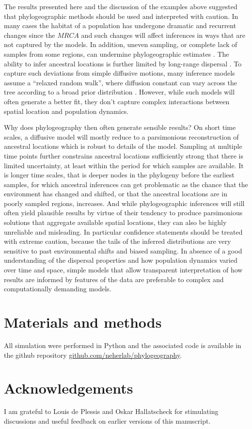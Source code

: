 \documentclass[aps,rmp, twocolumn]{revtex4}
\begin{document}
The results presented here and the discussion of the examples above suggested that phylogeographic methods should be used and interpreted with caution.
In many cases the habitat of a population has undergone dramatic and recurrent changes since the $MRCA$ and such changes will affect inferences in ways that are not captured by the models.
In addition, uneven sampling, or complete lack of samples from some regions, can undermine phylogeographic estimates \citep{kalkauskas_sampling_2021,layan_impact_2023}.
The ability to infer ancestral locations is further limited by long-range dispersal \citep{hallatschek_acceleration_2014}.
To capture such deviations from simple diffusive motions, many inference models assume a ``relaxed random walk'', where diffusion constant can vary across the tree according to a broad prior distribution \citep{dellicour_relax_2021}.
However, while such models will often generate a better fit, they don't capture complex interactions between spatial location and population dynamics.

Why does phylogeography then often generate sensible results?
On short time scales, a diffusive model will mostly reduce to a parsimonious reconstruction of ancestral locations which is robust to details of the model.
Sampling at multiple time points further constrains ancestral locations sufficiently strong that there is limited uncertainty, at least within the period for which samples are available.
It is longer time scales, that is deeper nodes in the phylogeny before the earliest samples, for which ancestral inferences can get problematic as the chance that the environment has changed and shifted, or that the ancestral locations are in poorly sampled regions, increases.
And while phylogeographic inferences will still often yield plausible results by virtue of their tendency to produce parsimonious solutions that aggregate available spatial locations, they can also be highly unreliable and misleading.
In particular confidence statements should be treated with extreme caution, because the tails of the inferred distributions are very sensitive to past environmental shifts and biased sampling.
In absence of a good understanding of the dispersal properties and how population dynamics varied over time and space, simple models that allow transparent interpretation of how results are informed by features of the data are preferable to complex and computationally demanding models.

\section*{Materials and methods}
All simulation were performed in Python and the associated code is available in the github repository \href{https://github.com/neherlab/phylogeography}{github.com/neherlab/phylogeography}.

\section*{Acknowledgements}
I am grateful to Louis de Plessis and Oskar Hallatscheck for stimulating discussions and useful feedback on earlier versions of this manuscript.


\end{document}
